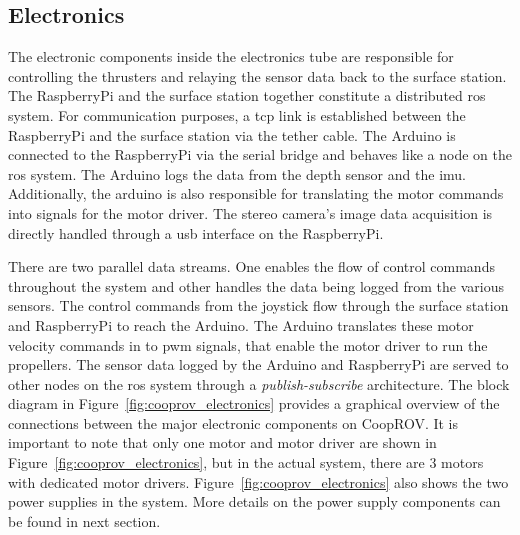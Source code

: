 \documentclass {udthesis}
\begin{document}
\subsection{Electronics}

The electronic components inside the electronics tube are responsible for controlling the thrusters and relaying the sensor data back to the surface station. The RaspberryPi and the surface station together constitute a distributed \gls{ros} system. For communication purposes, a \gls{tcp} link is established between the RaspberryPi and the surface station via the tether cable. The Arduino is connected to the RaspberryPi via the serial bridge and behaves like a node on the \gls{ros} system. The Arduino logs the data from the depth sensor and the \gls{imu}. Additionally, the arduino is also responsible for translating the motor commands into signals for the motor driver. The stereo camera's image data acquisition is directly handled through a usb interface on the RaspberryPi.

There are two parallel data streams. One enables the flow of control commands throughout the system and other handles the data being logged from the various sensors. The control commands from the joystick flow through the surface station and RaspberryPi to reach the Arduino. The Arduino translates these motor velocity commands in to \gls{pwm} signals, that enable the motor driver to run the propellers. The sensor data logged by the Arduino and RaspberryPi are served to other nodes on the \gls{ros} system through a \emph{publish-subscribe} architecture. The block diagram in Figure~\ref{fig:cooprov_electronics} provides a graphical overview of the connections between the major electronic components on CoopROV. It is important to note that only one motor and motor driver are shown in Figure~\ref{fig:cooprov_electronics}, but in the actual system, there are 3 motors with dedicated motor drivers. Figure~\ref{fig:cooprov_electronics} also shows the two power supplies in the system. More details 
on the power supply components can be found in next section.
\end{document}
